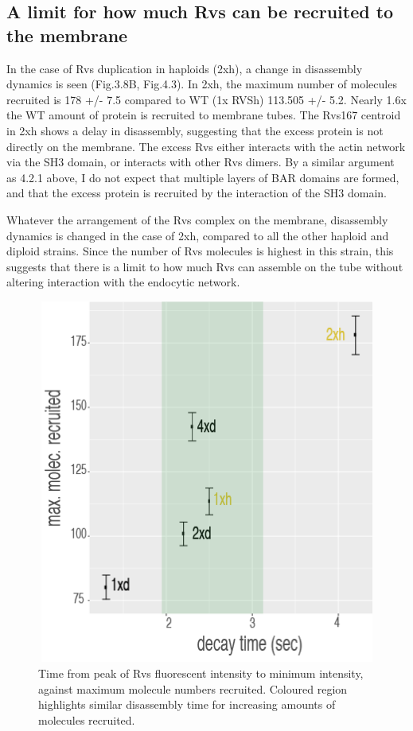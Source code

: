 \subsection{A limit for how much Rvs can be recruited to the membrane}
In the case of Rvs duplication in haploids (2xh), a change in disassembly dynamics is seen (Fig.3.8B, Fig.4.3). In 2xh, the maximum number of molecules recruited is 178 +/- 7.5 compared to WT (1x RVSh) 113.505 +/- 5.2. Nearly 1.6x the WT amount of protein is recruited to membrane tubes. The Rvs167 centroid in 2xh shows a delay in disassembly, suggesting that the excess protein is not directly on the membrane. The excess Rvs either interacts with the actin network via the SH3 domain, or interacts with other Rvs dimers. By a similar argument as 4.2.1 above, I do not expect that multiple layers of BAR domains are formed, and that the excess protein is recruited by the interaction of the SH3 domain.   

	\vspace{5mm}
Whatever the arrangement of the Rvs complex on the membrane, disassembly dynamics is changed in the case of 2xh, compared to all the other haploid and diploid strains. Since the number of Rvs molecules is highest in this strain, this suggests that there is a limit to how much Rvs can assemble on the tube without altering interaction with the endocytic network. 


\begin{figure}[H]
	\centering
	\includegraphics[width=12cm,height=12cm,keepaspectratio]{figures/discussion/decay_final}
	\caption[Synaptojanin-like proteins in yeast]
	{Time from peak of Rvs fluorescent intensity to minimum intensity, against maximum molecule numbers recruited. Coloured region highlights similar disassembly time for increasing amounts of molecules recruited.    
		\label{decay}}
\end{figure}

